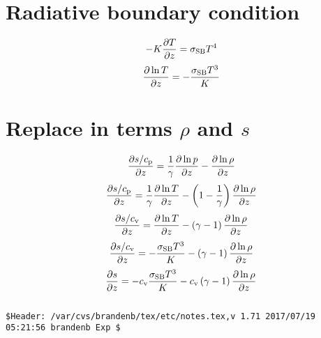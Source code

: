 \documentclass[twocolumn]{article}
\title{}
\author{}
\date{\today,~ $ $Revision: 1.71 $ $}
\begin{document}
\maketitle

\section{Radiative boundary condition}

\begin{equation}
-K{\partial T\over\partial z}=\sigma_{\rm SB} T^4
\end{equation}
\begin{equation}
{\partial\ln T\over\partial z}=-{\sigma_{\rm SB} T^3\over K}
\end{equation}

\section{Replace in terms $\rho$ and $s$}

\begin{equation}
{\partial s/c_{\rm p}\over\partial z}
={1\over\gamma}{\partial\ln p\over\partial z}
-{\partial\ln\rho\over\partial z}
\end{equation}
\begin{equation}
{\partial s/c_{\rm p}\over\partial z}
={1\over\gamma}{\partial\ln T\over\partial z}
-\left(1-{1\over\gamma}\right){\partial\ln\rho\over\partial z}
\end{equation}
\begin{equation}
{\partial s/c_{\rm v}\over\partial z}
={\partial\ln T\over\partial z}
-\left(\gamma-1\right){\partial\ln\rho\over\partial z}
\end{equation}
\begin{equation}
{\partial s/c_{\rm v}\over\partial z}
=-{\sigma_{\rm SB} T^3\over K}
-\left(\gamma-1\right){\partial\ln\rho\over\partial z}
\end{equation}
\begin{equation}
{\partial s\over\partial z}
=-c_{\rm v}{\sigma_{\rm SB} T^3\over K}
-c_{\rm v}\left(\gamma-1\right){\partial\ln\rho\over\partial z}
\end{equation}


\begin{verbatim}
\end{verbatim}




\vfill\bigskip\noindent\tiny\begin{verbatim}
$Header: /var/cvs/brandenb/tex/etc/notes.tex,v 1.71 2017/07/19 05:21:56 brandenb Exp $
\end{verbatim}
\end{document}
